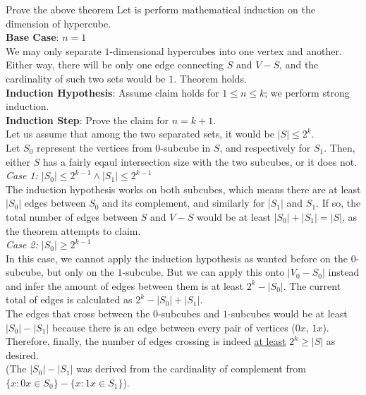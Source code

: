 \begin{ln-quest}{Prove the above theorem}{}
    Let is perform mathematical induction on the dimension of hypercube. \\
    \textbf{Base Case}: $n = 1$ \\
    We may only separate $1$-dimensional hypercubes into one vertex and another. Either way, there will be only one edge connecting $S$ and $V - S$, and the cardinality of such two sets would be $1$. Theorem holds. \\
    \textbf{Induction Hypothesis}: Assume claim holds for $1 \leq n \leq k$; we perform strong induction. \\
    \textbf{Induction Step}: Prove the claim for $n = k + 1$. \\
    Let us assume that among the two separated sets, it would be $|S| \leq 2^k$. \\
    Let $S_0$ represent the vertices from $0$-subcube in $S$, and respectively for $S_1$. Then, either $S$ has a fairly eqaul intersection size with the two subcubes, or it does not. \\
    \textit{Case 1: $|S_0| \leq 2^{k - 1} \land |S_1| \leq 2^{k - 1}$} \\
    The induction hypothesis works on both subcubes, which means there are at least $|S_0|$ edges between $S_0$ and its complement, and similarly for $|S_1|$ and $S_1$. If so, the total number of edges between $S$ and $V - S$ would be at least $|S_0| + |S_1| = |S|$, as the theorem attempts to claim. \\
    \textit{Case 2: $|S_0| \geq 2^{k - 1}$} \\
    In this case, we cannot apply the induction hypothesis as wanted before on the $0$-subcube, but only on the $1$-subcube. But we can apply this onto $|V_0 - S_0|$ instead and infer the amount of edges between them is at least $2^k - |S_0|$. The current total of edges is calculated as $2^k - |S_0| + |S_1|$. \\
    The edges that cross between the $0$-subcubes and $1$-subcubes would be at least $|S_0| - |S_1|$ because there is an edge between every pair of vertices ($0x$, $1x$). Therefore, finally, the number of edges crossing is indeed \underline{at least} $2^k \geq |S|$ as desired. \\
    (The $|S_0| - |S_1|$ was derived from the cardinality of complement from $\{x : 0x \in S_0\} - \{x : 1x \in S_1\}$).
\end{ln-quest}

